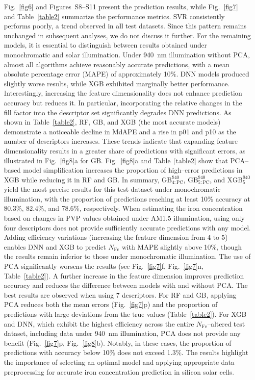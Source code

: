 \documentclass[a4paper,fleqn]{cas-sc}
\begin{document}
Fig.~\ref{fig6} and Figures~S8–S11 present the prediction results, while Fig.~\ref{fig7} and Table~\ref{table2} summarize the performance metrics. 
SVR consistently performs poorly, a trend observed in all test datasets. 
Since this pattern remains unchanged in subsequent analyses, we do not discuss it further. 
For the remaining models, it is essential to distinguish between results obtained under monochromatic and solar illumination. 
Under 940~nm illumination without PCA, almost all algorithms achieve reasonably accurate predictions, with a mean absolute percentage error (MAPE) of approximately 10\%.
DNN models produced slightly worse results, while XGB exhibited marginally better performance. 
Interestingly, increasing the feature dimensionality does not enhance prediction accuracy but reduces it. 
In particular, incorporating the relative changes in the fill factor into the descriptor set significantly degrades DNN predictions.
As shown in Table~\ref{table2}, RF, GB, and XGB (the most accurate models) demonstrate a noticeable decline in MdAPE and a rise in p01 and p10 as the number of descriptors increases. 
These trends indicate that expanding feature dimensionality results in a greater share of predictions with significant errors, as illustrated in Fig.~\ref{fig8}a for GB. 
Fig.~\ref{fig8}a and Table~\ref{table2} show that PCA--based model simplification increases the proportion of high--error predictions in XGB while reducing it in RF and GB. 
In summary, $\mathrm{GB}^\mathrm{940}_\mathrm{4:PC}$, $\mathrm{GB}^\mathrm{940}_\mathrm{5:PC}$, and $\mathrm{XGB}^\mathrm{940}_\mathrm{5}$ yield the most precise results for this test dataset under monochromatic illumination, with the proportion of predictions reaching at least 10\% accuracy at 80.3\%, 82.4\%, and 78.6\%, respectively.
When estimating the iron concentration based on changes in PVP values obtained under AM1.5 illumination, using only four descriptors does not provide sufficiently accurate predictions with any model. 
Adding efficiency variations (increasing the feature dimension from 4 to 5) enables DNN and XGB to predict $N_\mathrm{Fe}$ with MAPE slightly above 10\%, though the results remain inferior to those under monochromatic illumination.
The use of PCA significantly worsens the results (see Fig.~\ref{fig7}f, Fig.~\ref{fig7}n, Table~\ref{table2}). 
A further increase in the feature dimension improves prediction accuracy and reduces the difference between models with and without PCA. 
The best results are observed when using 7 descriptors. 
For RF and GB, applying PCA reduces both the mean errors (Fig.~\ref{fig7}p) and the proportion of predictions with large deviations from the true values (Table~\ref{table2}).
For XGB and DNN, which exhibit the highest efficiency across the entire $N_\mathrm{Fe}$--altered test dataset, including data under 940~nm illumination, PCA does not provide any benefit (Fig.~\ref{fig7}p, Fig.~\ref{fig8}b). 
Notably, in these cases, the proportion of predictions with accuracy below 10\% does not exceed 1.3\%.
The results highlight the importance of selecting an optimal model and applying appropriate data preprocessing for accurate iron concentration prediction in silicon solar cells.
\end{document}
